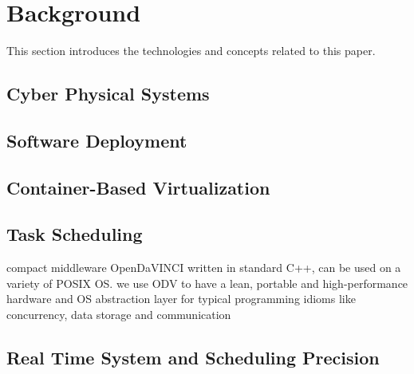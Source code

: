 
\section{Background}
This section introduces the technologies and concepts related to this paper.



\subsection{Cyber Physical Systems}
\subsection{Software Deployment}
\subsection{Container-Based Virtualization}
\subsection{Task Scheduling} %
compact middleware OpenDaVINCI written in standard C++, can be used on a variety of POSIX OS. 
we use ODV to have a lean, portable and high-performance hardware and OS abstraction layer for typical programming idioms like concurrency, data storage and communication
\subsection{Real Time System and Scheduling Precision}



